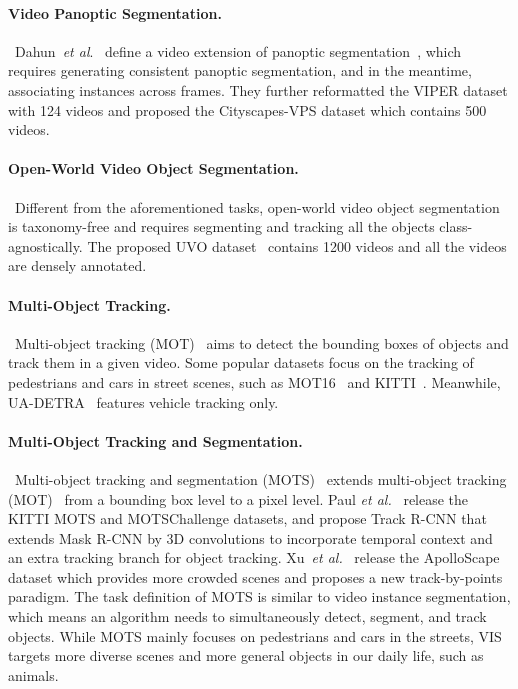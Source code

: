 \documentclass[twocolumn]{svjour3}          \smartqed  \usepackage{graphicx}
\newcommand{\etal}{\textit{et al}.}
\def\myTextColor{\textcolor[rgb]{0, 0, 0}}
\begin{document}
\begin{sloppypar}
\paragraph{Video Panoptic Segmentation.}~Dahun~\etal~\cite{kim2020video} define a video extension of panoptic segmentation~\cite{panoptic0}, which requires generating consistent panoptic segmentation, and in the meantime, associating instances across frames. They further reformatted the VIPER dataset with 124 videos and proposed the Cityscapes-VPS dataset which contains 500 videos.

\paragraph{Open-World Video Object Segmentation.}~Different from the aforementioned tasks, open-world video object segmentation~\cite{uvo} is taxonomy-free and requires segmenting and tracking all the objects class-agnostically. The proposed UVO dataset~\cite{uvo} contains 1200 videos and all the videos are densely annotated.

\myTextColor{\paragraph{Multi-Object Tracking.}~Multi-object tracking (MOT)~\cite{mot} aims to detect the bounding boxes of objects and track them in a given video. Some popular datasets focus on the tracking of pedestrians and cars in street scenes, such as MOT16~\cite{mot16} and KITTI~\cite{kitti}. Meanwhile, UA-DETRA~\cite{ua_detrac} features vehicle tracking only.}

\paragraph{Multi-Object Tracking and Segmentation.}~Multi-object tracking and segmentation (MOTS)~\cite{mots} extends multi-object tracking (MOT)~\cite{mot} from a bounding box level to a pixel level.
Paul \textit{et al.}~\cite{mots} release the KITTI MOTS and MOTSChallenge datasets, and propose Track R-CNN that extends Mask R-CNN by 3D convolutions to incorporate temporal context and an extra tracking branch for object tracking. Xu~\textit{et al.}~\cite{apolo-mots} release the ApolloScape dataset which provides more crowded scenes and proposes a new track-by-points paradigm. \myTextColor{The task definition of MOTS is similar to video instance segmentation, which means an algorithm needs to simultaneously detect, segment, and track objects. While MOTS mainly focuses on pedestrians and cars in the streets, VIS targets more diverse scenes and more general objects in our daily life, such as animals.} 



\end{sloppypar}
\end{document}
